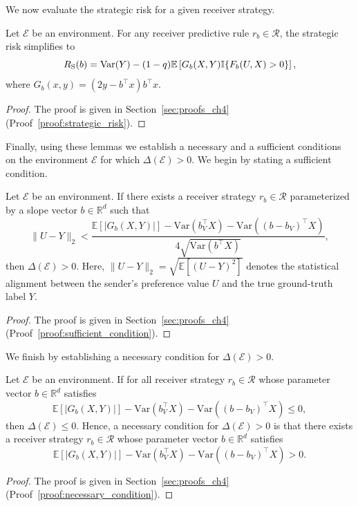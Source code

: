 We now evaluate the strategic risk for a given receiver strategy.
\begin{lemma}\label{lemma:regression_strategic_risk}   
Let $\mathcal{E}$ be an environment. For any receiver predictive rule $r_b \in \mathcal{R}$, the strategic risk simplifies to
\begin{equation}
    \label{eq:strategic_risk_formula}
    R_{\mathrm{S}}(b) = \mathrm{Var}(Y) - (1 - q)\mathbb{E}\left[ G_b(X, Y) \mathbb{I}\{F_b(U, X) > 0\} \right],
\end{equation}
where $G_b(x,y) = (2y - b^\top x)b^\top x$.
\end{lemma} 
\begin{proof} The proof is given in Section~\ref{sec:proofs_ch4} (Proof~\ref{proof:strategic_risk}).
\end{proof}

Finally, using these lemmas we establish a necessary and a sufficient conditions on the environment $\mathcal{E}$ for which $\Delta(\mathcal{E})>0$. We begin by stating a sufficient condition.
\begin{theorem}
\label{thm:sufficient_condition}  
Let $\mathcal{E}$ be an environment. If there exists a receiver strategy $r_b \in \mathcal{R}$ parameterized by a slope vector $b\in\mathbb{R}^d$ such that
\begin{equation*}
    \|U - Y\|_2 < \frac{\mathbb{E}[|G_b(X, Y)|] - \mathrm{Var}(b_V^\top X) - \mathrm{Var}((b - b_V)^\top X)}{4\sqrt{\mathrm{Var}(b^\top X)}},
\end{equation*}
then $\Delta(\mathcal{E}) > 0$. Here, $\|U - Y\|_2 = \sqrt{\mathbb{E}[(U - Y)^2]}$ denotes the statistical alignment between the sender's preference value $U$ and the true ground-truth label $Y$.
\end{theorem}
\begin{proof} The proof is given in Section~\ref{sec:proofs_ch4} (Proof~\ref{proof:sufficient_condition}).
\end{proof}

We finish by establishing a necessary condition for $\Delta(\mathcal{E}) > 0$.
\begin{theorem}
\label{thm:necessary_condition}
Let $\mathcal{E}$ be an environment. If for all receiver strategy $r_b \in \mathcal{R}$ whose parameter vector $b\in\mathbb{R}^d$ satisfies
\begin{equation*}
    \mathbb{E}[|G_b(X, Y)|] - \mathrm{Var}(b_V^\top X) - \mathrm{Var}((b - b_V)^\top X) \le 0,
\end{equation*}
then $\Delta(\mathcal{E}) \leq 0$.
Hence, a necessary condition for $\Delta(\mathcal{E}) > 0$ is that there exists a receiver strategy $r_b \in \mathcal{R}$ whose parameter vector $b\in\mathbb{R}^d$ satisfies
\begin{equation*}
    \mathbb{E}[|G_b(X, Y)|] - \mathrm{Var}(b_V^\top X) - \mathrm{Var}((b - b_V)^\top X) > 0.
\end{equation*}
\end{theorem}
\begin{proof} The proof is given in Section~\ref{sec:proofs_ch4} (Proof~\ref{proof:necessary_condition}).
\end{proof}

